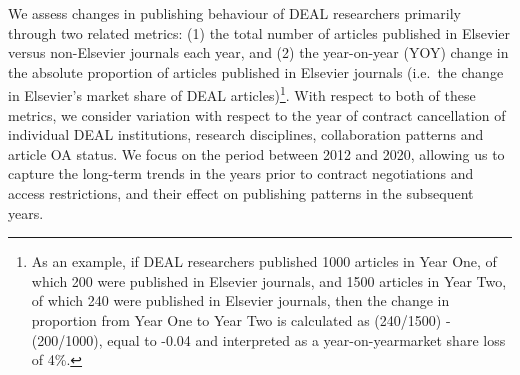 \documentclass[
]{article}
\begin{document}
We assess changes in publishing behaviour of DEAL researchers primarily through two related metrics: (1) the total number of articles published in Elsevier versus non-Elsevier journals each year, and (2) the year-on-year (YOY) change in the absolute proportion of articles published in Elsevier journals (i.e.~the change in Elsevier's market share of DEAL articles)\footnote{As an example, if DEAL researchers published 1000 articles in Year One, of which 200 were published in Elsevier journals, and 1500 articles in Year Two, of which 240 were published in Elsevier journals, then the change in proportion from Year One to Year Two is calculated as (240/1500) - (200/1000), equal to -0.04 and interpreted as a year-on-yearmarket share loss of 4\%.}. With respect to both of these metrics, we consider variation with respect to the year of contract cancellation of individual DEAL institutions, research disciplines, collaboration patterns and article OA status. We focus on the period between 2012 and 2020, allowing us to capture the long-term trends in the years prior to contract negotiations and access restrictions, and their effect on publishing patterns in the subsequent years.
\end{document}
